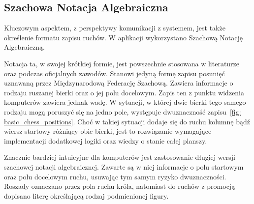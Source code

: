\subsection{Szachowa Notacja Algebraiczna}
\label{subsec:notacja-algebraiczna}

Kluczowym aspektem, z perspektywy komunikacji z systemem, jest także określenie formatu zapisu ruchów.
W aplikacji wykorzystano Szachową Notację Algebraiczną.

Notacja ta, w swojej krótkiej formie, jest powszechnie stosowana w literaturze oraz podczas oficjalnych zawodów.
Stanowi jedyną formę zapisu posunięć uznawaną przez Międzynarodową Federację Szachową.
Zawiera informacje o rodzaju ruszanej bierki oraz o jej polu docelowym.
Zapis ten z punktu widzenia komputerów zawiera jednak wadę.
W sytuacji, w której dwie bierki tego samego rodzaju mogą poruszyć się na jedno pole, występuje dwuznaczność zapisu~\ref{fig: basic_chess_positions}.
Choć w takiej sytuacji dodaje się do ruchu kolumnę bądź wiersz startowy różniący obie bierki, jest to rozwiązanie wymagające implementacji dodatkowej logiki oraz wiedzy o stanie całej planszy.

Znacznie bardziej intuicyjne dla komputerów jest zastosowanie długiej wersji szachowej notacji algebraicznej.
Zawarte są w niej informacje o polu startowym oraz polu docelowym ruchu, usuwając tym samym ryzyko dwuznaczności.
Roszady oznaczano przez pola ruchu króla, natomiast do ruchów z promocją dopisano literę określającą rodzaj podmienionej figury.

